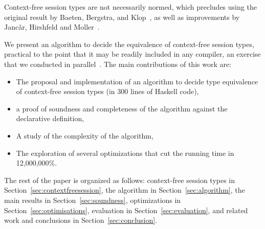 Context-free session types are not necessarily normed, which precludes
using the original result by Baeten, Bergstra, and
Klop~\cite{baeten1993decidability}, as well as improvements by Janc\v
ar, Hirshfeld and
Moller~\cite{DBLP:journals/tcs/HirshfeldJM96,DBLP:conf/concur/HirshfeldM94}.



We present an algorithm to decide the equivalence of context-free
session types, practical to the point that it may be readily included
in any compiler, an exercise that we conducted in
parallel~\cite{freeST}.
%
The main contributions of this work are:
%
\begin{itemize}
\item The proposal and implementation of an algorithm to decide type
  equivalence of context-free session types (in 300 lines of Haskell
  code),
\item a proof of soundness and completeness of the algorithm against
  the declarative definition,
\item A study of the complexity of the algorithm,
\item The exploration of several optimizations that cut the running
  time in 12,000,000\%.
\end{itemize}


The rest of the paper is organized as follows: context-free session
types in Section~\ref{sec:contextfreesession}, the algorithm in
Section~\ref{sec:algorithm}, the main results in
Section~\ref{sec:soundness}, optimizations in
Section~\ref{sec:optimisations}, evaluation in
Section~\ref{sec:evaluation}, and related work and conclusions in
Section~\ref{sec:conclusion}.



